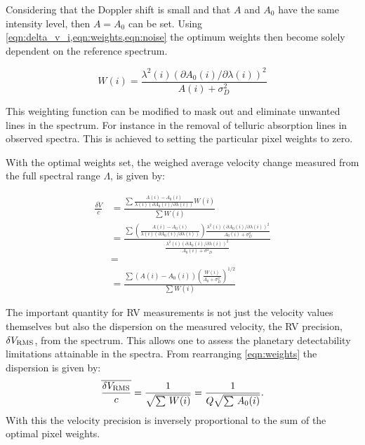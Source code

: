 Considering that the Doppler shift is small and that \(A\) and \(A_0\) have the same intensity level, then \(A = A_0\) can be set.
Using \cref{eqn:delta_v_i,eqn:weights,eqn:noise} the optimum weights then become solely dependent on the reference spectrum.

\begin{equation}
W(i) = \frac{{\lambda}^{2}(i) {({\partial A_0(i)}/{\partial \lambda(i)})}^{2}}{A(i) + {\sigma}^{2}_{D}} \label{eqn:optimal_weight}
\end{equation}

This weighting function can be modified to mask out and eliminate unwanted lines in the spectrum.
For instance in the removal of telluric absorption lines in observed spectra.
This is achieved to setting the particular pixel weights to zero.

With the optimal weights set, the weighed average velocity change measured from the full spectral range \(\Lambda\), is given by:

\begin{eqnarray}
    \frac{\overline{\delta V}}{c} &= \frac{
        \sum{
            \frac{
                A(i) - A_0(i)}{
                \lambda(i) \left({\partial A_0(i)}/{\partial \lambda(i)}\right)} W(i)}}{
             \sum{{W(i)}}} \\
    &= \frac{
        \sum {
            (\frac
                {A(i) - A_0(i)}
                {\lambda(i) (\partial A_0(i)/\partial \lambda(i))}) \frac
                    {{\lambda}^{2}(i) {({\partial A_0(i)}/{\partial \lambda(i)})}^{2}}
                    {A_{0}(i) + {\sigma}^{2}_{D}}
                 }
         }
    {\frac
        {{\lambda}^{2}(i) {({\partial A_0(i)}/{\partial \lambda(i)})}^{2}}{A_{0}(i) + {{\sigma}^{2}}_{D}}
        } \\
    &= \\
    &= \frac{\sum{(A(i) - A_0(i)){\left(\frac{W(i)}{A_0 +{\sigma}_{D}^{2}}\right)}^{1/2}}}{\sum{W(i)}}
    \label{eqn:delta_v_eqarray}
\end{eqnarray}

The important quantity for {RV} measurements is not just the velocity values themselves but also the dispersion on the measured velocity, the {RV} precision, \(\delta V_{\textrm{RMS}}\), from the spectrum.
This allows one to assess the planetary detectability limitations attainable in the spectra.
From rearranging \cref{eqn:weights} the dispersion is given by:
\begin{equation}
    \overline{\frac{\delta V_{\textrm{RMS}}}{c}} = \frac{1}{\sqrt{\sum{\,W(i)}}} = \frac{1}{Q \sqrt{\sum{\,A_0(i)}}}.\label{eqn:dv_rms}
\end{equation}
With this the velocity precision is inversely proportional to the sum of the optimal pixel weights.

